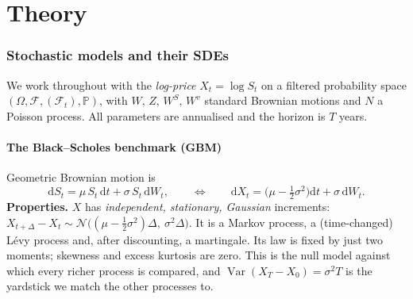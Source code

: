 \documentclass[11pt]{article}
\newcommand{\dd}{\mathrm{d}}
\newcommand{\Var}{\operatorname{Var}}
\begin{document}
\part{Theory}

\section{Stochastic models and their SDEs}\label{sec:models}
We work throughout with the \emph{log-price} $X_t = \log S_t$ on a filtered
probability space $(\Omega,\mathcal{F},(\mathcal{F}_t),\mathbb{P})$, with
$W,\,Z,\,W^S,\,W^v$ standard Brownian motions and $N$ a Poisson process. All
parameters are annualised and the horizon is $T$ years.

\subsection{The Black--Scholes benchmark (GBM)}
Geometric Brownian motion is
\begin{equation}
  \dd S_t = \mu\, S_t\,\dd t + \sigma\, S_t\,\dd W_t,
  \qquad\Longleftrightarrow\qquad
  \dd X_t = \Big(\mu - \tfrac12\sigma^2\Big)\dd t + \sigma\,\dd W_t .
\end{equation}
\textbf{Properties.} $X$ has \emph{independent, stationary, Gaussian} increments:
$X_{t+\Delta}-X_t \sim \mathcal{N}\big((\mu-\tfrac12\sigma^2)\Delta,\ \sigma^2\Delta\big)$.
It is a Markov process, a (time-changed) L\'evy process and, after discounting, a
martingale. Its law is fixed by just two moments; skewness and excess kurtosis are
zero. This is the null model against which every richer process is compared, and
$\Var(X_T-X_0)=\sigma^2 T$ is the yardstick we match the other processes to.
\end{document}
